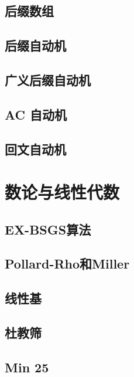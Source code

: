 \documentclass[a4paper,12pt]{article}
\begin{document}
\subsection{后缀数组}

\subsection{后缀自动机}

\subsection{广义后缀自动机}

\subsection{AC 自动机}

\subsection{回文自动机}


\section{数论与线性代数}

\subsection{EX-BSGS算法}

\subsection{Pollard-Rho和Miller}

\subsection{线性基}


\subsection{杜教筛}

\subsection{Min 25}

\end{document}
